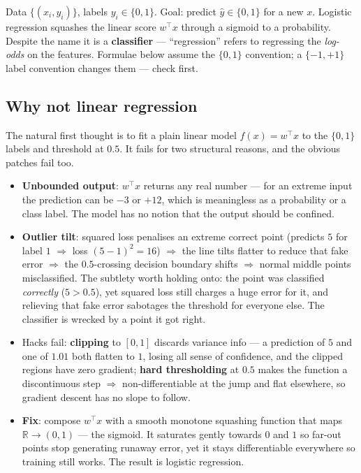 \documentclass[11pt, a4paper]{article}
\newcommand{\kw}[1]{\textbf{#1}}
\begin{document}
\begin{setupbox}
Data $\{(x_i,y_i)\}$, labels $y_i\in\{0,1\}$. Goal: predict $\hat y\in\{0,1\}$ for a new $x$.
Logistic regression squashes the linear score $w^\top x$ through a sigmoid to a probability.
Despite the name it is a \kw{classifier} — ``regression'' refers to regressing the \emph{log-odds}
on the features. Formulae below assume the $\{0,1\}$ convention; a $\{-1,+1\}$ label convention
changes them — check first.
\end{setupbox}

\subsection{Why not linear regression}

The natural first thought is to fit a plain linear model $f(x)=w^\top x$ to the $\{0,1\}$ labels and
threshold at $0.5$. It fails for two structural reasons, and the obvious patches fail too.

\begin{itemize}
  \item \kw{Unbounded output}: $w^\top x$ returns any real number — for an extreme input the
  prediction can be $-3$ or $+12$, which is meaningless as a probability or a class label. The model
  has no notion that the output should be confined.
  \item \kw{Outlier tilt}: squared loss penalises an extreme correct point (predicts $5$ for label
  $1$ $\Rightarrow$ loss $(5-1)^2=16$) $\Rightarrow$ the line tilts flatter to reduce that fake error
  $\Rightarrow$ the $0.5$-crossing decision boundary shifts $\Rightarrow$ normal middle points
  misclassified. The subtlety worth holding onto: the point was classified \emph{correctly}
  ($5>0.5$), yet squared loss still charges a huge error for it, and relieving that fake error
  sabotages the threshold for everyone else. The classifier is wrecked by a point it got right.
  \item Hacks fail: \kw{clipping} to $[0,1]$ discards variance info — a prediction of $5$ and one of
  $1.01$ both flatten to $1$, losing all sense of confidence, and the clipped regions have zero
  gradient; \kw{hard thresholding} at $0.5$ makes the function a discontinuous step
  $\Rightarrow$ non-differentiable at the jump and flat elsewhere, so gradient descent has no slope
  to follow.
  \item \kw{Fix}: compose $w^\top x$ with a smooth monotone squashing function that maps
  $\mathbb R\to(0,1)$ — the sigmoid. It saturates gently towards $0$ and $1$ so far-out points stop
  generating runaway error, yet it stays differentiable everywhere so training still works. The
  result is logistic regression.
\end{itemize}
\end{document}
